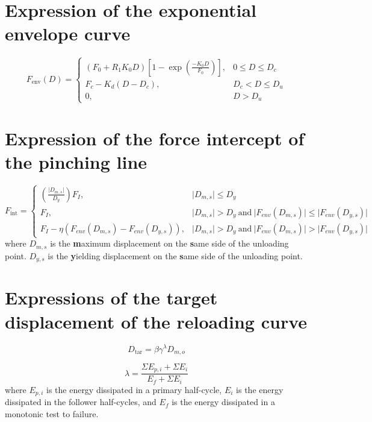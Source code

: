 \documentclass[12pt]{article}
\begin{document}
\section{Expression of the exponential envelope curve}
\begin{equation}
F_{\mathrm{env}}(D) = 
\begin{cases}
(F_0+R_1 K_0 D)\left[ 1-\exp(\frac{-K_0 D}{F_0}) \right], & 0\leq D \leq D_c \\ 
F_c - K_d (D-D_c), & D_c < D \leq D_u \\ 
0, & D > D_u
\end{cases}
\end{equation}

\section{Expression of the force intercept of the pinching line}
\begin{equation}
F_{\mathrm{int}} = 
\begin{cases}
\left(\frac{\lvert D_{m,s} \rvert}{D_y}\right) F_{I},  & \lvert D_{m,s} \rvert \leq D_y \\ 
F_{I},  &  \lvert D_{m,s} \rvert > D_y \ \mathrm{and} \ \lvert F_{env}(D_{m,s}) \rvert \leq \lvert F_{env}(D_{y,s}) \rvert  \\ 
F_{I} - \eta\left(F_{env}(D_{m,s})-F_{env}(D_{y,s})\right), & \lvert D_{m,s} \rvert > D_y \ \mathrm{and} \ \lvert F_{env}(D_{m,s}) \rvert > \lvert F_{env}(D_{y,s}) \rvert 
\end{cases}
\end{equation}
where $D_{m,s}$ is the \textbf{m}aximum displacement on the \textbf{s}ame side of the unloading point.
$D_{y,s}$ is the \textbf{y}ielding displacement on the \textbf{s}ame side of the unloading point.

\section{Expressions of the target displacement of the reloading curve}
\begin{equation}
    D_{\mathrm{tar}} = \beta\gamma^{\lambda}D_{m,o}
\end{equation}

\begin{equation}
\lambda = \frac{\Sigma E_{p,i} + \Sigma E_i}{E_f + \Sigma E_i}
\end{equation}
where $E_{p,i}$ is the energy dissipated in a primary half-cycle, $E_i$ is the energy dissipated in the follower half-cycles, and $E_f$ is the energy dissipated in a monotonic test to failure. 
\end{document}
